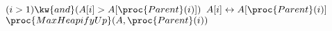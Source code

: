 \begin{codebox}
\li \If $(i > 1) \kw{ and } (A[i] > A[\proc{Parent}(i)])$
\li     \Then
            $A[i] \leftrightarrow A[\proc{Parent}(i)]$
\li         $\proc{MaxHeapifyUp}(A,\proc{Parent}(i))$
        \End
\end{codebox}